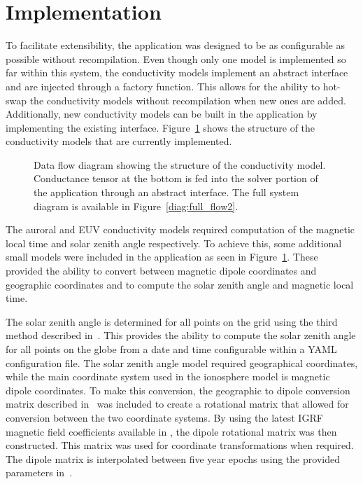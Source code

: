 \section{Implementation}
\label{sec:conductivity_implementation}
To facilitate extensibility, the application was designed to be as configurable as possible without recompilation. Even though only one model is implemented so far within this system, the conductivity models implement an abstract interface and are injected through a factory function. This allows for the ability to hot-swap the conductivity models without recompilation when new ones are added. Additionally, new conductivity models can be built in the application by implementing the existing interface. Figure~\ref{diag:conductivity_diagram} shows the structure of the conductivity models that are currently implemented.
\begin{figure}[H]
	\centering
	
	\caption{Data flow diagram showing the structure of the conductivity model. Conductance tensor at the bottom is fed into the solver portion of the application through an abstract interface. The full system diagram is available in Figure~\ref{diag:full_flow2}.}
	\label{diag:conductivity_diagram}
\end{figure}
The auroral and EUV conductivity models required computation of the magnetic local time and solar zenith angle respectively. To achieve this, some additional small models were included in the application as seen in Figure~\ref{diag:conductivity_diagram}. These provided the ability to convert between magnetic dipole coordinates and geographic coordinates and to compute the solar zenith angle and magnetic local time.

The solar zenith angle is determined for all points on the grid using the third method described in~\citet{grena2012}. This provides the ability to compute the solar zenith angle for all points on the globe from a date and time configurable within a YAML configuration file. The solar zenith angle model required geographical coordinates, while the main coordinate system used in the ionosphere model is magnetic dipole coordinates. To make this conversion, the geographic to dipole conversion matrix described in~\citet{laundal2017} was included to create a rotational matrix that allowed for conversion between the two coordinate systems. By using the latest IGRF magnetic field coefficients available in \citet{igrf2024}, the dipole rotational matrix was then constructed. This matrix was used for coordinate transformations when required. The dipole matrix is interpolated between five year epochs using the provided parameters in~\citep{igrf2024}.

